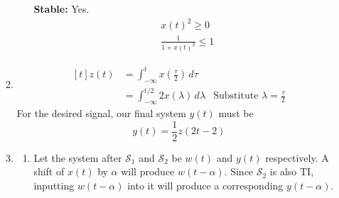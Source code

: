 \documentclass[12pt]{article}
\begin{document}
\begin{enumerate}
\begin{enumerate}
\begin{enumerate}
                                    \textbf{Stable:} Yes.
                                    \begin{gather*}
                                          x(t)^2 \ge 0 \\
                                          \frac{1}{1+x(t)^2} \le 1
                                    \end{gather*}
                        \end{enumerate}
                  \item \[\begin{aligned}[t]
                                    z(t)
                                     & =\int_{-\infty}^{t} x\left(\frac{\tau}{2}\right)\,d\tau                                              \\
                                     & = \int_{-\infty}^{t/2} 2x(\lambda)\,d\lambda            & \text{Substitute }\lambda = \frac{\tau}{2}
                              \end{aligned}\]
                        For the desired signal, our final system $y(t)$ must be
                        \[\boxed{y(t)=\frac{1}{2}z(2t-2)}\]
                  \item \begin{enumerate}
                              \item Let the system after $\mathcal{S}_1$ and
                                    $\mathcal{S}_2$ be $w(t)$ and $y(t)$ respectively.
                                    A shift of $x(t)$ by $\alpha$ will produce $w(t-\alpha)$.
                                    Since $\mathcal{S}_2$ is also TI, inputting $w(t-\alpha)$ into it
                                    will produce a corresponding $y(t-\alpha)$.


\end{enumerate}
\end{enumerate}
\end{enumerate}
\end{document}
